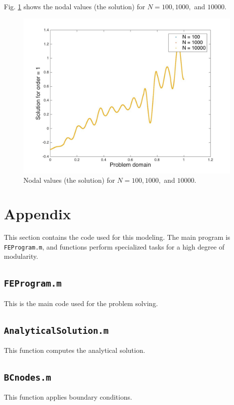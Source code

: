 \documentclass[10pt]{article}
\begin{document}
Fig. \ref{fig:NodalValues} shows the nodal values (the solution) for \(N=100, 1000, \) and \(10000\). 

\begin{figure}[H]
  \centering
  \includegraphics[width=13cm]{Nplot.jpg}
  \caption{Nodal values (the solution) for \(N=100, 1000, \) and \(10000\).}
  \label{fig:NodalValues}
\end{figure}

\section{Appendix}

This section contains the code used for this modeling. The main program is \texttt{FEProgram.m}, and functions perform specialized tasks for a high degree of modularity.

\subsection{\texttt{FEProgram.m}}
This is the main code used for the problem solving.


\subsection{\texttt{AnalyticalSolution.m}}
This function computes the analytical solution.


\subsection{\texttt{BCnodes.m}}
This function applies boundary conditions.

\end{document}

